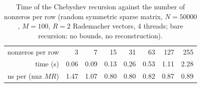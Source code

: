 \begin{table}[t]\caption{Time of the Chebyshev recursion against the number of nonzeros per row (random symmetric sparse matrix, $N=50000$, $M=100$, $R=2$ Rademacher vectors, 4 threads; bare recursion: no bounds, no reconstruction).}\label{tab:sp}\begin{ruledtabular}\begin{tabular}{rrrrrrrr}
nonzeros per row & 3 & 7 & 15 & 31 & 63 & 127 & 255 \\ \colrule
time (s) & 0.06 & 0.09 & 0.13 & 0.26 & 0.53 & 1.11 & 2.28 \\
ns per (nnz $M R$) & 1.47 & 1.07 & 0.80 & 0.80 & 0.82 & 0.87 & 0.89 \\
\end{tabular}\end{ruledtabular}\end{table}
